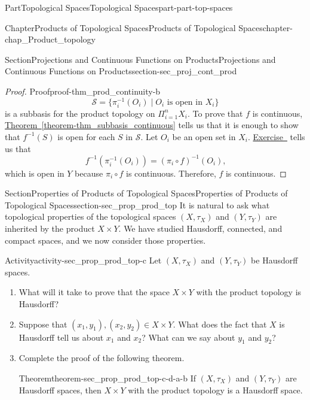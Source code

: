 \documentclass[oneside,10pt,]{book}
\newcommand{\xreffont}{\relax}
\numberwithin{equation}{chapter}
\newcommand{\CS}{\mathcal{S}}
\begin{document}
\begin{partptx}{Part}{Topological Spaces}{}{Topological Spaces}{}{}{part-part-top-spaces}
\begin{chapterptx}{Chapter}{Products of Topological Spaces}{}{Products of Topological Spaces}{}{}{chapter-chap_Product_topology}
\begin{sectionptx}{Section}{Projections and Continuous Functions on Products}{}{Projections and Continuous Functions on Products}{}{}{section-sec_proj_cont_prod}
\begin{proof}{Proof}{}{proof-thm_prod_continuity-b}
\begin{equation*}
\CS = \{\pi_i^{-1}(O_i) \mid O_i \text{ is open in }  X_i\}
\end{equation*}
is a subbasis for the product topology on \(\Pi_{i=1}^n X_i\). To prove that \(f\) is continuous, \hyperref[theorem-thm_subbasis_continuous]{Theorem~{\xreffont\ref{theorem-thm_subbasis_continuous}}} tells us that it is enough to show that \(f^{-1}(S)\) is open for each \(S\) in \(\CS\). Let \(O_i\) be an open set in \(X_i\). \hyperlink{exercise-ex_inverse_composite_sets}{Exercise~{\xreffont 9}} tells us that%
\begin{equation*}
f^{-1}(\pi_i^{-1}(O_i)) = (\pi_i \circ f)^{-1}(O_i)\text{,}
\end{equation*}
which is open in \(Y\) because \(\pi_i \circ f\) is continuous. Therefore, \(f\) is continuous.%
\end{proof}
\end{sectionptx}
%
%
\typeout{************************************************}
\typeout{************************************************}
%
\begin{sectionptx}{Section}{Properties of Products of Topological Spaces}{}{Properties of Products of Topological Spaces}{}{}{section-sec_prop_prod_top}
It is natural to ask what topological properties of the topological spaces \((X, \tau_X)\) and \((Y, \tau_Y)\) are inherited by the product \(X \times Y\). We have studied Hausdorff, connected, and compact spaces, and we now consider those properties.%
\begin{activity}{Activity}{}{activity-sec_prop_prod_top-c}%
Let \((X, \tau_X)\) and \((Y, \tau_Y)\) be Hausdorff spaces.%
\begin{enumerate}[font=\bfseries,label=(\alph*),ref=\alph*]%
\item{}What will it take to prove that the space \(X \times Y\) with the product topology is Hausdorff?%
\item{}Suppose that \((x_1,y_1), (x_2, y_2) \in X \times Y\). What does the fact that \(X\) is Hausdorff tell us about \(x_1\) and \(x_2\)? What can we say about \(y_1\) and \(y_2\)?%
\item{}Complete the proof of the following theorem.%
\begin{theorem}{Theorem}{}{}{theorem-sec_prop_prod_top-c-d-a-b}%
If \((X, \tau_X)\) and \((Y, \tau_Y)\) are Hausdorff spaces, then \(X \times Y\) with the product topology is a Hausdorff space.%
\end{theorem}

\end{enumerate}
\end{activity}
\end{sectionptx}
\end{chapterptx}
\end{partptx}
\end{document}
